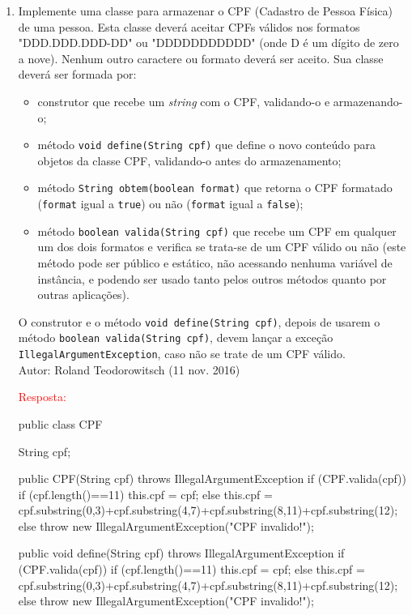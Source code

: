 \documentclass[onecolumn,a4paper,10pt]{report}
\newcommand{\+}{\, + \,}
\newcommand{\<}{\hspace*{-0.4cm}}
\begin{document}
\begin{enumerate}
\item Implemente uma classe para armazenar o CPF (Cadastro de Pessoa Física) de uma pessoa. Esta classe deverá aceitar CPFs válidos nos formatos
"DDD.DDD.DDD-DD" ou "DDDDDDDDDDD" (onde D é um dígito de zero a nove). Nenhum outro caractere ou formato deverá ser aceito. Sua classe deverá ser formada por:
\begin{itemize}
\item construtor que recebe um \emph{string} com o CPF, validando-o e armazenando-o;
\item método \texttt{void define(String cpf)} que define o novo conteúdo para objetos da classe CPF, validando-o antes do armazenamento;
\item método \texttt{String obtem(boolean format)} que retorna o CPF formatado (\texttt{format} igual a \texttt{true}) ou não (\texttt{format} igual a \texttt{false});
\item método \texttt{boolean valida(String cpf)} que recebe um CPF em qualquer um dos dois formatos e verifica se trata-se de um CPF válido ou não (este método pode ser público e estático, não acessando nenhuma variável de instância, e podendo ser usado tanto pelos outros métodos quanto por outras aplicações).
\end{itemize}
O construtor e o método \texttt{void define(String cpf)}, depois de usarem o método \texttt{boolean valida(String cpf)}, devem lançar a exceção \texttt{IllegalArgumentException}, caso não se trate de um CPF válido.\\
{\tiny Autor: Roland Teodorowitsch (11 nov. 2016)}\\
\newpage
{\tiny \textcolor{red}{Resposta:}\\
\begin{javacode}
public class CPF {
    String cpf;
    
    public CPF(String cpf) throws IllegalArgumentException {
        if (CPF.valida(cpf)) {
            if (cpf.length()==11)
                this.cpf = cpf;
            else
                this.cpf = cpf.substring(0,3)+cpf.substring(4,7)+cpf.substring(8,11)+cpf.substring(12);
        }
        else
            throw  new IllegalArgumentException("CPF invalido!");
    }
    
    public void define(String cpf) throws IllegalArgumentException {
        if (CPF.valida(cpf)) {
            if (cpf.length()==11)
                this.cpf = cpf;
            else
                this.cpf = cpf.substring(0,3)+cpf.substring(4,7)+cpf.substring(8,11)+cpf.substring(12);
        }
        else
            throw  new IllegalArgumentException("CPF invalido!");
    }
    
}
\end{javacode}}
\end{enumerate}
\end{document}
